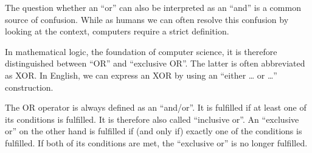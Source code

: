 
The question whether an ``or'' can also be interpreted as an ``and'' is a common source of confusion. While as humans we can often resolve this confusion by looking at the context, computers require a strict definition.

In mathematical logic, the foundation of computer science, it is therefore distinguished between ``OR'' and ``exclusive OR''. The latter is often abbreviated as XOR. In English, we can express an XOR by using an ``either \ldots{} or \ldots{}'' construction.

The OR operator is always defined as an ``and/or''. It is fulfilled if at least one of its conditions is fulfilled. It is therefore also called ``inclusive or''. An ``exclusive or'' on the other hand is fulfilled if (and only if) exactly one of the conditions is fulfilled. If both of its conditions are met, the ``exclusive or'' is no longer fulfilled.
